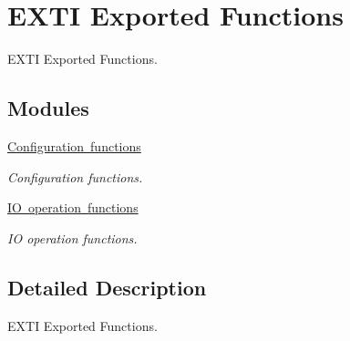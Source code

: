 \hypertarget{group___e_x_t_i___exported___functions}{}\section{E\+X\+TI Exported Functions}
\label{group___e_x_t_i___exported___functions}


E\+X\+TI Exported Functions.  


\subsection*{Modules}
\begin{DoxyCompactItemize}
\item 
\mbox{\hyperlink{group___e_x_t_i___exported___functions___group1}{Configuration functions}}
\begin{DoxyCompactList}\small\item\em Configuration functions. \end{DoxyCompactList}\item 
\mbox{\hyperlink{group___e_x_t_i___exported___functions___group2}{I\+O operation functions}}
\begin{DoxyCompactList}\small\item\em IO operation functions. \end{DoxyCompactList}\end{DoxyCompactItemize}


\subsection{Detailed Description}
E\+X\+TI Exported Functions. 

